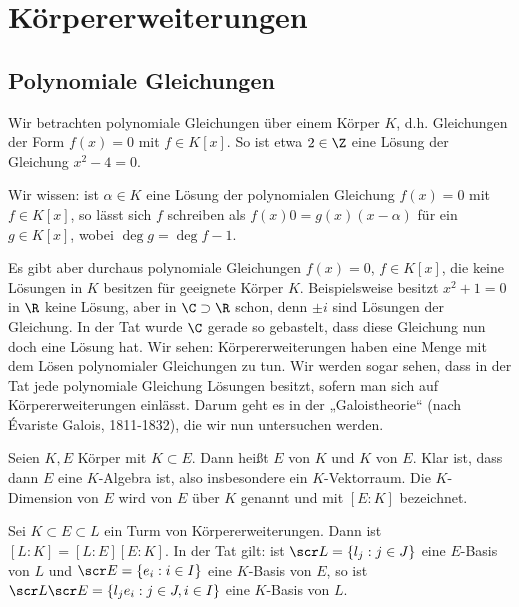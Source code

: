 \chapter{Körpererweiterungen}


\section{Polynomiale Gleichungen}

Wir betrachten polynomiale Gleichungen über einem Körper $K$, d.h. Gleichungen der Form $f(x) = 0$ mit $f \in K[x]$.
So ist etwa $2 \in \Z$ eine Lösung der Gleichung $x^2 - 4 = 0$.

Wir wissen: ist $\alpha \in K$ eine Lösung der polynomialen Gleichung $f(x) = 0$ mit $f \in K[x]$, so lässt sich $f$ schreiben als $f(x)0= g(x)(x - \alpha)$ für ein $g \in K[x]$, wobei $\deg g = \deg f - 1$.

Es gibt aber durchaus polynomiale Gleichungen $f(x) = 0$, $f \in K[x]$, die keine Lösungen in $K$ besitzen für geeignete Körper $K$.
Beispielsweise besitzt $x^2 + 1 = 0$ in $\R$ keine Lösung, aber in $\C \supset \R$ schon, denn $\pm i$ sind Lösungen der Gleichung.
In der Tat wurde $\C$ gerade so gebastelt, dass diese Gleichung nun doch eine Lösung hat.
Wir sehen: Körpererweiterungen haben eine Menge mit dem Lösen polynomialer Gleichungen zu tun.
Wir werden sogar sehen, dass in der Tat jede polynomiale Gleichung Lösungen besitzt, sofern man sich auf Körpererweiterungen einlässt.
Darum geht es in der „Galoistheorie“ (nach Évariste Galois, 1811-1832), die wir nun untersuchen werden.

\begin{df} \label{18.1-1}
	Seien $K, E$ Körper mit $K \subset E$.
	Dann heißt $E$  von $K$ und $K$  von $E$.
	Klar ist, dass dann $E$ eine $K$-Algebra ist, also insbesondere ein $K$-Vektorraum.
	Die $K$-Dimension von $E$ wird  von $E$ über $K$ genannt und mit $[E : K]$ bezeichnet.
\end{df}

\begin{st} \label{18.1-2}
	Sei $K \subset E \subset L$ ein Turm von Körpererweiterungen.
	Dann ist $[L : K] = [L : E] [E : K]$.
	In der Tat gilt: ist $\scr L = \{l_j : j \in J\}$ eine $E$-Basis von $L$ und $\scr E = \{ e_i : i \in I \}$ eine $K$-Basis von $E$, so ist $\scr L \scr E = \{ l_j e_i : j \in J, i \in I \}$ eine $K$-Basis von $L$.
\end{st}

